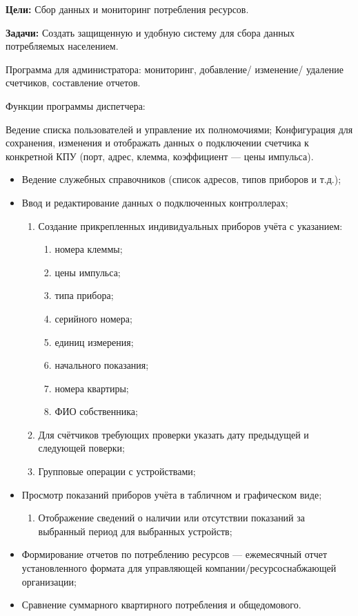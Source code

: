 \textbf{Цели:} Сбор данных и мониторинг потребления ресурсов.
 
\textbf{Задачи:}  Создать защищенную и удобную систему  для сбора данных потребляемых населением.

Программа для администратора: мониторинг, добавление/ изменение/ удаление счетчиков, составление отчетов. 

Функции программы диспетчера:

Ведение списка пользователей и управление их полномочиями;
Конфигурация для сохранения, изменения и отображать данных о подключении счетчика к конкретной КПУ (порт, адрес, клемма, коэффициент --- цены импульса). 
\begin{itemize}
	\item Ведение служебных справочников (список адресов, типов приборов и т.д.);
	\item Ввод и редактирование данных о подключенных контроллерах;
	\begin{enumerate}
		\item Создание прикрепленных индивидуальных приборов учёта с указанием:
		\begin{enumerate}
			\item номера клеммы; 
			\item цены импульса; 
			\item типа прибора;
			\item серийного номера; 
			\item единиц измерения;
			\item начального показания;
			\item номера квартиры;
			\item ФИО собственника;
		\end{enumerate}
		\item Для счётчиков требующих проверки указать дату предыдущей и следующей поверки;
		\item Групповые операции с устройствами;
	\end{enumerate}
	\item Просмотр показаний приборов учёта в табличном и графическом виде;
	\begin{enumerate}
		\item Отображение сведений о наличии или отсутствии показаний за выбранный период для выбранных устройств;
	\end{enumerate}
	\item Формирование отчетов по потреблению ресурсов --- ежемесячный отчет установленного формата для управляющей компании/ресурсоснабжающей организации;
	\item Сравнение суммарного квартирного потребления и общедомового.
	
\end{itemize}